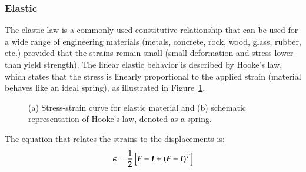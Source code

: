 \subsubsection{Elastic}
The elastic law is a commonly used constitutive relationship that can be used
for a wide range of engineering materials (\eg metals, concrete, rock, wood,
glass, rubber, etc.) provided that the strains remain small (\ie small
deformation and stress lower than yield strength). The linear elastic behavior
is described by Hooke's law, which states that the stress is linearly
proportional to the applied strain (material behaves like an ideal spring), as
illustrated in Figure~\ref{fig:smm:cl:elastic}.
\begin{figure}[!htb]
  \begin{center}

    \hspace{0.05\textwidth}
    \caption{(a) Stress-strain curve for elastic material and (b) schematic representation of Hooke's law, denoted as a spring.}
    \label{fig:smm:cl:elastic}
  \end{center}
\end{figure}
The equation that relates the strains to the displacements is:
\begin{equation}\label{eqn:smm:strain_inf}
  \boldsymbol{\epsilon} = \frac{1}{2} \left[ \boldsymbol{F}-\boldsymbol{I}+(\boldsymbol{F}-\boldsymbol{I})^T \right]
\end{equation}
